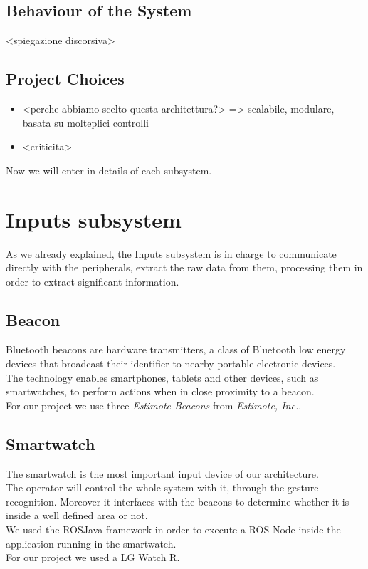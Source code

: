 \documentclass[12pt]{article}
\begin{document}
{\subsection{Behaviour of the System}
<spiegazione discorsiva>

\subsection{Project Choices}

\begin{itemize}
\item <perche abbiamo scelto questa architettura?> => scalabile, modulare, basata su molteplici controlli
\item <criticita>
\end{itemize}

Now we will enter in details of each subsystem.
\section{Inputs subsystem}
As we already explained, the Inputs subsystem is in charge to communicate directly with the peripherals, extract the raw data from them, processing them in order to extract significant information.

\subsection{Beacon}
Bluetooth beacons are hardware transmitters, a class of Bluetooth low energy devices that broadcast their identifier to nearby portable electronic devices. \\The technology enables smartphones, tablets and other devices, such as smartwatches, to perform actions when in close proximity to a beacon. \\For our project we use three \textit{Estimote Beacons} from \textit{Estimote, Inc.}. 

\subsection{Smartwatch}
The smartwatch is the most important input device of our architecture. \\The operator will control the whole system with it, through the gesture recognition. Moreover it interfaces with the beacons to determine whether it is inside a well defined area or not.\\We used the ROSJava framework in order to execute a ROS Node inside the application running in the smartwatch.\\
For our project we used a LG Watch R. \\

}
\end{document}
